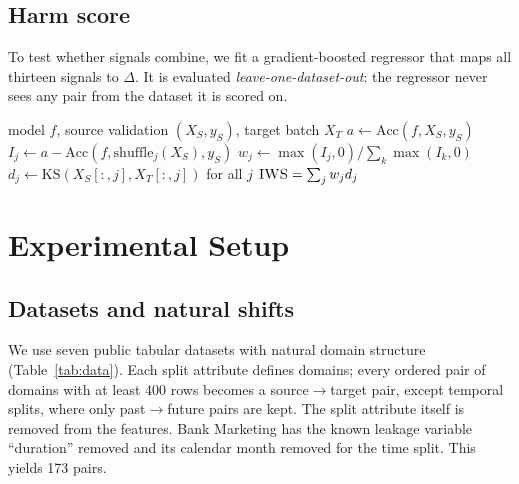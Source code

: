 \documentclass[conference]{IEEEtran}
\theoremstyle{plainhead}
\newcommand{\iws}{\textsc{IWS}}
\begin{document}
\subsection{Harm score}
To test whether signals combine, we fit a gradient-boosted regressor that maps all thirteen signals to $\Delta$. It is evaluated \emph{leave-one-dataset-out}: the regressor never sees any pair from the dataset it is scored on.

\begin{algorithm}[t]
\caption{Computing \iws{} for a deployed model}
\label{alg:iws}
\begin{algorithmic}[1]
\Require model $f$, source validation $(X_S,y_S)$, target batch $X_T$
\State $a \gets \mathrm{Acc}(f, X_S, y_S)$
 
  \State $I_j \gets a - \mathrm{Acc}(f, \mathrm{shuffle}_j(X_S), y_S)$
\EndFor
\State $w_j \gets \max(I_j,0)/\sum_k \max(I_k,0)$
  \State $d_j \gets \mathrm{KS}(X_S[:,j], X_T[:,j])$ for all $j$
  \State \Return $\iws=\sum_j w_j d_j$
\EndFor
\end{algorithmic}
\end{algorithm}

\section{Experimental Setup}
\subsection{Datasets and natural shifts}
We use seven public tabular datasets with natural domain structure (Table~\ref{tab:data}). Each split attribute defines domains; every ordered pair of domains with at least 400 rows becomes a source$\to$target pair, except temporal splits, where only past$\to$future pairs are kept. The split attribute itself is removed from the features. Bank Marketing has the known leakage variable ``duration'' removed and its calendar month removed for the time split. This yields 173 pairs.
\end{document}
